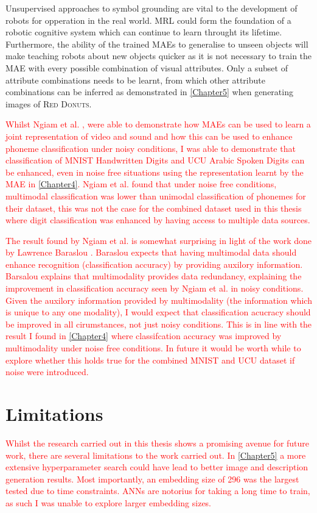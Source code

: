 Unsupervised approaches to symbol grounding are vital to the development of robots for opperation in the real world. \ac{MRL} could form the foundation of a robotic cognitive system which can continue to learn throught its lifetime. Furthermore, the ability of the trained \acp{MAE} to generalise to unseen objects will make teaching robots about new objects quicker as it is not necessary to train the \ac{MAE} with every possible combination of visual attributes. Only a subset of attribute combinations needs to be learnt, from which other attribute combinations can be inferred as demonstrated in \autoref{Chapter5} when generating images of \textsc{Red Donuts}.

\textcolor{red}{Whilst Ngiam et al. \cite{ngiam2011multimodal}, were able to demonstrate how \acp{MAE} can be used to learn a joint representation of video and sound and how this can be used to enhance phoneme classification under noisy conditions, I was able to demonstrate that classification of MNIST Handwritten Digits and UCU Arabic Spoken Digits can be enhanced, even in noise free situations using the representation learnt by the \ac{MAE} in \autoref{Chapter4}. Ngiam et al. found that under noise free conditions, multimodal classification was lower than unimodal classification of phonemes for their dataset, this was not the case for the combined dataset used in this thesis where digit classification was enhanced by having access to multiple data sources.}

\textcolor{red}{The result found by Ngiam et al. \cite{ngiam2011multimodal} is somewhat surprising in light of the work done by Lawrence Baraslou \cite{barsalou2008grounded}. Baraslou expects that having multimodal data should enhance recognition (classification accuracy) by providing auxilory information. Barsalou explains that multimodality provides data redundancy, explaining the improvement in classification accuracy seen by Ngiam et al. in noisy conditions. Given the auxilory information provided by multimodality (the information which is unique to any one modality), I would expect that classification acucracy should be improved in all cirumstances, not just noisy conditions. This is in line with the result I found in \autoref{Chapter4} where classifcation accuracy was improved by multimodality under noise free conditions. In future it would be worth while to explore whether this holds true for the combined MNIST and UCU dataset if noise were introduced.}

\section{Limitations}
\textcolor{red}{Whilst the research carried out in this thesis shows a promising avenue for future work, there are several limitations to the work carried out. In \autoref{Chapter5} a more extensive hyperparameter search could have lead to better image and description generation results. Most importantly, an embedding size of 296 was the largest tested due to time constraints. \aclp{ANN} are notorius for taking a long time to train, as such I was unable to explore larger embedding sizes.}

